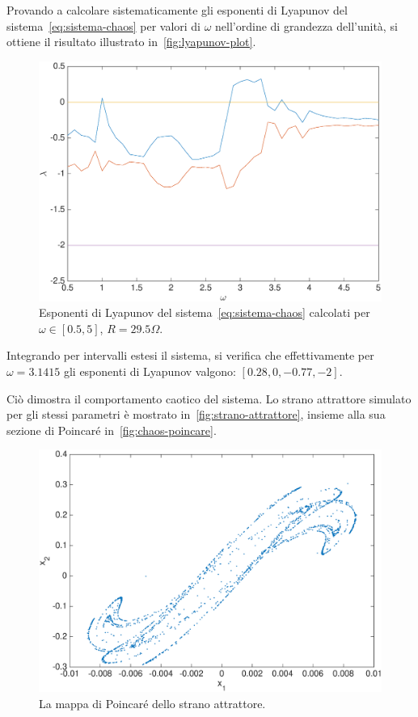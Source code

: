 Provando a calcolare sistematicamente gli esponenti di Lyapunov del sistema~\ref{eq:sistema-chaos} per valori di $\omega$ nell'ordine di grandezza dell'unità, si ottiene il risultato illustrato in~\autoref{fig:lyapunov-plot}.

\begin{figure}
    \centering
    \includegraphics[width=\textwidth]{matcont/LyapunovPlot}
    \caption{Esponenti di Lyapunov del sistema~\ref{eq:sistema-chaos} calcolati per $\omega \in [0.5, 5]$, $R=29.5 \Omega$.}
    \label{fig:lyapunov-plot}
\end{figure}

Integrando per intervalli estesi il sistema, si verifica che effettivamente per $\omega = 3.1415$ gli esponenti di Lyapunov valgono: $[0.28, 0, -0.77, -2]$.

Ciò dimostra il comportamento caotico del sistema. Lo strano attrattore simulato per gli stessi parametri è mostrato in~\autoref{fig:strano-attrattore}, insieme alla sua sezione di Poincaré in~\autoref{fig:chaos-poincare}.

\begin{figure}
    \centering
    \includegraphics[width=\textwidth]{matcont/PoincareCaos}
    \caption{La mappa di Poincaré dello strano attrattore.}
    \label{fig:chaos-poincare}
\end{figure}

